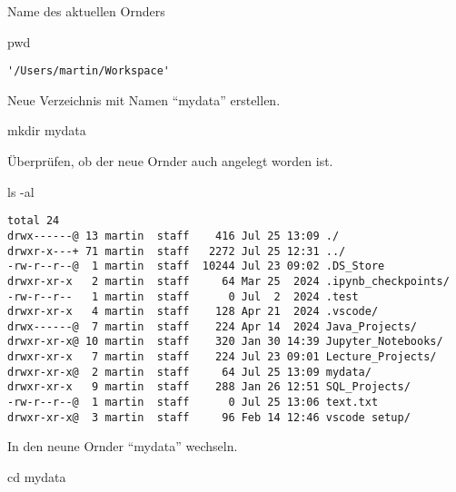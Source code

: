 \documentclass[
  11pt,
  a4paper,
  DIV=11,
  numbers=noendperiod]{scrartcl}
\newenvironment{Shaded}{\begin{snugshade}}{\end{snugshade}}
\newcommand{\NormalTok}[1]{\textcolor[rgb]{0.00,0.23,0.31}{#1}}
\newcommand{\OperatorTok}[1]{\textcolor[rgb]{0.37,0.37,0.37}{#1}}
\begin{document}
Name des aktuellen Ornders

\begin{Shaded}
\begin{Highlighting}[numbers=left,,]
\NormalTok{pwd}
\end{Highlighting}
\end{Shaded}

\begin{verbatim}
'/Users/martin/Workspace'
\end{verbatim}

Neue Verzeichnis mit Namen ``mydata'' erstellen.

\begin{Shaded}
\begin{Highlighting}[numbers=left,,]
\NormalTok{mkdir mydata}
\end{Highlighting}
\end{Shaded}

Überprüfen, ob der neue Ornder auch angelegt worden ist.

\begin{Shaded}
\begin{Highlighting}[numbers=left,,]
\NormalTok{ls }\OperatorTok{{-}}\NormalTok{al}
\end{Highlighting}
\end{Shaded}

\begin{verbatim}
total 24
drwx------@ 13 martin  staff    416 Jul 25 13:09 ./
drwxr-x---+ 71 martin  staff   2272 Jul 25 12:31 ../
-rw-r--r--@  1 martin  staff  10244 Jul 23 09:02 .DS_Store
drwxr-xr-x   2 martin  staff     64 Mar 25  2024 .ipynb_checkpoints/
-rw-r--r--   1 martin  staff      0 Jul  2  2024 .test
drwxr-xr-x   4 martin  staff    128 Apr 21  2024 .vscode/
drwx------@  7 martin  staff    224 Apr 14  2024 Java_Projects/
drwxr-xr-x@ 10 martin  staff    320 Jan 30 14:39 Jupyter_Notebooks/
drwxr-xr-x   7 martin  staff    224 Jul 23 09:01 Lecture_Projects/
drwxr-xr-x@  2 martin  staff     64 Jul 25 13:09 mydata/
drwxr-xr-x   9 martin  staff    288 Jan 26 12:51 SQL_Projects/
-rw-r--r--@  1 martin  staff      0 Jul 25 13:06 text.txt
drwxr-xr-x@  3 martin  staff     96 Feb 14 12:46 vscode setup/
\end{verbatim}

In den neune Ornder ``mydata'' wechseln.

\begin{Shaded}
\begin{Highlighting}[numbers=left,,]
\NormalTok{cd mydata}
\end{Highlighting}
\end{Shaded}
\end{document}
